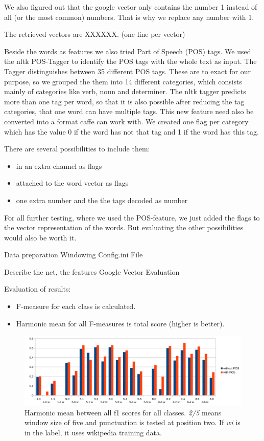 We also figured out that the google vector only contains the number 1 instead of all (or the most common) numbers. 
That is why we replace any number with 1.

The retrieved vectors are XXXXXX. (one line per vector)

Beside the words as features we also tried Part of Speech (POS) tags. 
We used the nltk POS-Tagger to identify the POS tags with the whole text as input.
The Tagger distinguishes between 35 different POS tags. 
These are to exact for our purpose, so we grouped the them into 14 different categories, which consists mainly of categories like verb, noun and determiner. 
The nltk tagger predicts more than one tag per word, so that it is also possible after reducing the tag categories, that one word can have multiple tags.
This new feature need also be converted into a format caffe can work with. 
We created one flag per category which has the value 0 if the word has not that tag and 1 if the word has this tag.

There are several possibilities to include them:
\begin{itemize}
\item in an extra channel as flags
\item attached to the word vector as flags
\item one extra number and the the tags decoded as number
\end{itemize}

For all further testing, where we used the POS-feature, we just added the flags to the vector representation of the words.
But evaluating the other possibilities would also be worth it. 

Data preparation
Windowing
Config.ini File

Describe the net, the features
Google Vector
Evaluation


Evaluation of results:
\begin{itemize}
\item F-measure for each class is calculated.
\item Harmonic mean for all F-measures is total score (higher is better).
\end{itemize}

\begin{figure}[ht]
    \centering
    \includegraphics[width=\textwidth]{img/window_eval.png}
    \caption{Harmonic mean between all f1 scores for all classes. \emph{2/5} means window size of five and punctuation is tested at position two. If \emph{wi} is in the label, it uses wikipedia training data.}
    \label{window_eval}
\end{figure}

